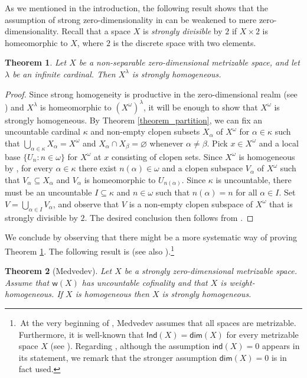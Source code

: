 \documentclass{amsart}
\theoremstyle{plain}
\newtheorem{theorem}{Theorem}[section]
\theoremstyle{definition}
\newcommand{\weight}{\mathsf{w}}
\begin{document}
As we mentioned in the introduction, the following result shows that the assumption of strong zero-dimensionality in \cite[Corollary 29]{medini_products} can be weakened to mere zero-dimensionality. Recall that a space $X$ is \emph{strongly divisible} by $2$ if $X\times 2$ is homeomorphic to $X$, where $2$ is the discrete space with two elements.
\begin{theorem}\label{theorem_main}
Let $X$ be a non-separable zero-dimensional metrizable space, and let $\lambda$ be an infinite cardinal. Then $X^\lambda$ is strongly homogeneous.	
\end{theorem}
\begin{proof}
Since strong homogeneity is productive in the zero-dimensional realm (see \cite[Corollary 14]{medini_products}) and $X^\lambda$ is homeomorphic to $(X^\omega)^\lambda$, it will be enough to show that $X^\omega$ is strongly homogeneous. By Theorem \ref{theorem_partition}, we can fix an uncountable 	cardinal $\kappa$ and non-empty clopen subsets $X_\alpha$ of $X^\omega$ for $\alpha\in\kappa$ such that $\bigcup_{\alpha\in\kappa}X_\alpha=X^\omega$ and $X_\alpha\cap X_\beta=\varnothing$ whenever $\alpha\neq\beta$. Pick $x\in X^\omega$ and a local base $\{U_n:n\in\omega\}$ for $X^\omega$ at $x$ consisting of clopen sets. Since $X^\omega$ is homogeneous by \cite{dow_pearl}, for every $\alpha\in\kappa$ there exist $n(\alpha)\in\omega$ and a clopen subspace $V_\alpha$ of $X^\omega$ such that $V_\alpha\subseteq X_\alpha$ and $V_\alpha$ is homeomorphic to $U_{n(\alpha)}$. Since $\kappa$ is uncountable, there must be an uncountable $I\subseteq\kappa$ and $n\in\omega$ such that $n(\alpha)=n$ for all $\alpha\in I$. Set $V=\bigcup_{\alpha\in I}V_\alpha$, and observe that $V$ is a non-empty clopen subspace of $X^\omega$ that is strongly divisible by $2$. The desired conclusion then follows from \cite[Proposition 24]{medini_products}.
\end{proof}

We conclude by observing that there might be a more systematic way of proving Theorem \ref{theorem_main}. The following result is \cite[Theorem 5]{medvedev_closed} (see also \cite[Theorem 6]{medvedev_homogeneous}).\footnote{\,At the very beginning of \cite{medvedev_closed}, Medvedev assumes that all spaces are metrizable. Furthermore, it is well-known that $\mathsf{Ind}(X)=\mathsf{dim}(X)$ for every metrizable space $X$ (see \cite[Theorem 7.3.2]{engelking}). Regarding \cite[Theorem 6]{medvedev_homogeneous}, although the assumption $\mathsf{ind}(X)=0$ appears in its statement, we remark that the stronger assumption $\mathsf{dim}(X)=0$ is in fact used.}
\begin{theorem}[Medvedev]\label{theorem_medvedev}
Let $X$ be a strongly zero-dimensional metrizable space. Assume that $\weight(X)$ has uncountable cofinality and that $X$ is weight-homogeneous. If $X$ is homogeneous then $X$ is strongly homogeneous.
\end{theorem}
\end{document}

